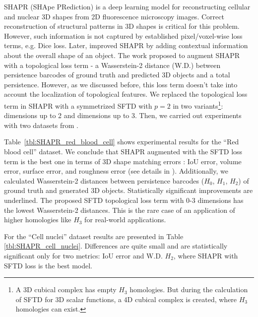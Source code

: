 \documentclass[runningheads]{llncs}
\begin{document}
SHAPR (SHApe PRediction) \cite{waibel2022shapr} is a deep learning model for reconstructing cellular and nuclear 3D shapes from 2D fluorescence microscopy images. 
Correct reconstruction of structural patterns in 3D shapes is critical for this problem. However, such information is not captured by established pixel/voxel-wise loss terms, e.g. Dice loss.
Later, \cite{waibel2022capturing} improved SHAPR by adding contextual information about the overall shape of an object. 
The work \cite{waibel2022capturing} proposed to augment SHAPR with a topological loss term - a Wasserstein-2 distance (W.D.) between persistence barcodes of ground truth and predicted 3D objects and a total persistence.
However, as we discussed before, this loss term doesn't take into account the localization of topological features.
We replaced the topological loss term in SHAPR with a symmetrized SFTD with $p = 2$ in two variants\footnote{A 3D cubical complex has empty $H_3$ homologies. But during the calculation of SFTD for 3D scalar functions, a 4D cubical complex is created, where $H_3$ homologies can exist.}: dimensions up to 2 and dimensions up to 3. Then, we carried out experiments with two datasets from \cite{waibel2022shapr}. 

Table~\ref{tbl:SHAPR_red_blood_cell} shows experimental results for the ``Red blood cell'' dataset.
We conclude that SHAPR augmented with the SFTD loss term is the best one in terms of 3D shape matching errors : IoU error, volume error, surface error, and roughness error (see details in \cite{waibel2022shapr}). Additionally, we calculated Wasserstein-2 distances between persistence barcodes ($H_0$, $H_1$, $H_2$) of ground truth and generated 3D objects. Statistically significant improvements are underlined. The proposed SFTD topological loss term with 0-3 dimensions has the lowest Wasserstein-2 distances. This is the rare case of an application of higher homologies like $H_3$ for real-world applications.

For the ``Cell nuclei'' dataset results are presented in Table \ref{tbl:SHAPR_cell_nuclei}. Differences are quite small and are statistically significant only for two metrics: IoU error and W.D. $H_2$, where SHAPR with SFTD loss is the best model.
\end{document}
